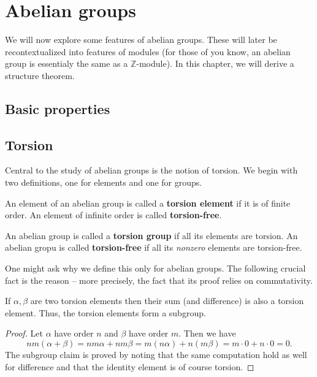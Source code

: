 \chapter{Abelian groups}

We will now explore some features of abelian groups. These will later be
recontextualized into features of modules (for those of you know, an abelian
group is essentialy the same as a \( \mathbb{Z} \)-module). In this chapter, we will
derive a structure theorem.

\section{Basic properties}


\section{Torsion}

Central to the study of abelian groups is the notion of torsion. We begin with~
two definitions, one for elements and one for groups.

\begin{defn}
    An element of an abelian group is called a \textbf{torsion element} if it is
    of finite order. An element of infinite order is called \textbf{torsion-free}.
\end{defn}

\begin{defn}
    An abelian group is called a \textbf{torsion group} if all its elements are torsion.
    An abelian gropu is called \textbf{torsion-free} if all its \emph{nonzero} elements
    are torsion-free.
\end{defn}

One might ask why we define this only for abelian groups. The following crucial fact
is the reason -- more precisely, the fact that its proof relies on commutativity.

\begin{thm}
    If \( \alpha, \beta \) are two torsion elements then their sum (and difference)
    is also a torsion element. Thus, the torsion elements form a subgroup.
\end{thm}

\begin{proof}
Let \( \alpha \) have order \( n \) and \( \beta \) have order \( m \). Then we have
\[ 
    nm(\alpha + \beta) = nm\alpha + nm\beta =  m(n\alpha) + n(m\beta) = m \cdot 0 + n \cdot 0 = 0.
\]
The subgroup claim is proved by noting that the same computation hold as well
for difference and that the identity element is of course torsion.
\end{proof}

